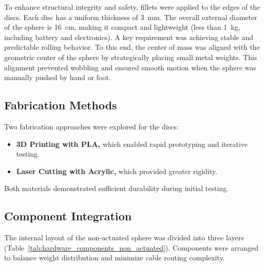 \documentclass[english, bachelor, utf8]{base/thesis_telematics}
\begin{document}
To enhance structural integrity and safety, fillets were applied to the edges of the discs. 
Each disc has a uniform thickness of \SI{3}{\milli\meter}.
The overall external diameter of the sphere is \SI{16}{\centi\meter}, making it compact and lightweight (less than \SI{1}{\kilo\gram}, including battery and electronics).
A key requirement was achieving stable and predictable rolling behavior. 
To this end, the center of mass was aligned with the geometric center of the sphere by strategically placing small metal weights. 
This alignment prevented wobbling and ensured smooth motion when the sphere was manually pushed by hand or foot.

\subsection{Fabrication Methods}
Two fabrication approaches were explored for the discs:
\begin{itemize}
    \item \textbf{3D Printing with PLA,} which enabled rapid prototyping and iterative testing.
    \item \textbf{Laser Cutting with Acrylic,} which provided greater rigidity.
\end{itemize}
Both materials demonstrated sufficient durability during initial testing.

\subsection{Component Integration}
The internal layout of the non-actuated sphere was divided into three layers (Table~\ref{tab:hardware_components_non_actuated}).
Components were arranged to balance weight distribution and minimize cable routing complexity.
\end{document}
